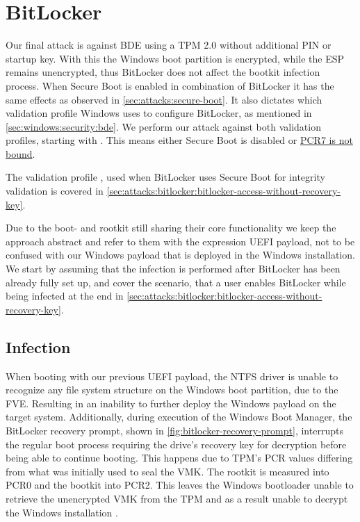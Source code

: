 \section{BitLocker}

Our final attack is against \ac{BDE} using a \ac{TPM} 2.0 without additional \ac{PIN} or startup key.
With this the Windows boot partition is encrypted, while the \ac{ESP} remains unencrypted, thus BitLocker does not affect the bootkit infection process.
When Secure Boot is enabled in combination of BitLocker it has the same effects as observed in \autoref{sec:attacks:secure-boot}.
It also dictates which validation profile Windows uses to configure BitLocker, as mentioned in \autoref{sec:windows:security:bde}.
We perform our attack against both validation profiles, starting with \hyperref[tab:pcr-usage]{}.
This means either Secure Boot is disabled or \hyperlink{pcr7-binding}{\ac{PCR}7 is not bound}.

The validation profile \hyperref[tab:pcr-usage]{}, used when BitLocker uses Secure Boot for integrity validation is covered in \autoref{sec:attacks:bitlocker:bitlocker-access-without-recovery-key}.

Due to the boot- and rootkit still sharing their core functionality we keep the approach abstract and refer to them with the expression \ac{UEFI} payload, not to be confused with our Windows payload that is deployed in the Windows installation.
We start by assuming that the infection is performed after BitLocker has been already fully set up, and cover the scenario, that a user enables BitLocker while being infected at the end in \autoref{sec:attacks:bitlocker:bitlocker-access-without-recovery-key}.


\subsection{Infection}

When booting with our previous \ac{UEFI} payload, the \ac{NTFS} driver is unable to recognize any file system structure  on the Windows boot partition, due to the \ac{FVE}.
Resulting in an inability to further deploy the Windows payload on the target system.
Additionally, during execution of the Windows Boot Manager, the BitLocker recovery prompt, shown in \autoref{fig:bitlocker-recovery-prompt}, interrupts the regular boot process requiring the drive's recovery key for decryption before being able to continue booting.
This happens due to \ac{TPM}'s \ac{PCR} values differing from what was initially used to seal the \ac{VMK}.
The rootkit is measured into \ac{PCR}0 and the bootkit into \ac{PCR}2.
This leaves the Windows bootloader unable to retrieve the unencrypted \ac{VMK} from the \ac{TPM} and as a result unable to decrypt the Windows installation \cite[Section 12]{windows-internals-7-part2}.

